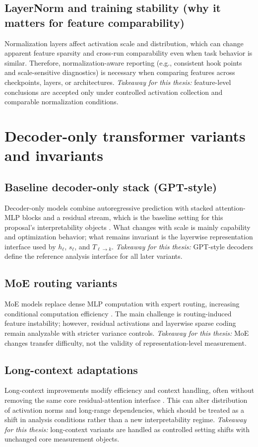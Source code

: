 \documentclass[../ppgc-tese.tex]{subfiles}
\begin{document}
    \subsection{LayerNorm and training stability (why it matters for feature comparability)}
Normalization layers affect activation scale and distribution, which can change apparent feature sparsity and cross-run comparability even when task behavior is similar. Therefore, normalization-aware reporting (e.g., consistent hook points and scale-sensitive diagnostics) is necessary when comparing features across checkpoints, layers, or architectures.
\textit{Takeaway for this thesis:} feature-level conclusions are accepted only under controlled activation collection and comparable normalization conditions.

\section{Decoder-only transformer variants and invariants}
\label{sec:decoder-variants-invariants}
\subsection{Baseline decoder-only stack (GPT-style)}
Decoder-only models combine autoregressive prediction with stacked attention-MLP blocks and a residual stream, which is the baseline setting for this proposal's interpretability objects \cite{radford2018improving,radford2019language,brown2020gpt3}. What changes with scale is mainly capability and optimization behavior; what remains invariant is the layerwise representation interface used by $h_\ell$, $s_\ell$, and $T_{\ell\to k}$.
\textit{Takeaway for this thesis:} GPT-style decoders define the reference analysis interface for all later variants.

\subsection{MoE routing variants}
MoE models replace dense MLP computation with expert routing, increasing conditional computation efficiency \cite{fedus2022switch,jiang2024mixtral}. The main challenge is routing-induced feature instability; however, residual activations and layerwise sparse coding remain analyzable with stricter variance controls.
\textit{Takeaway for this thesis:} MoE changes transfer difficulty, not the validity of representation-level measurement.

\subsection{Long-context adaptations}
Long-context improvements modify efficiency and context handling, often without removing the same core residual-attention interface \cite{rae2022scaling,press2022alibi}. This can alter distribution of activation norms and long-range dependencies, which should be treated as a shift in analysis conditions rather than a new interpretability regime.
\textit{Takeaway for this thesis:} long-context variants are handled as controlled setting shifts with unchanged core measurement objects.
\end{document}
